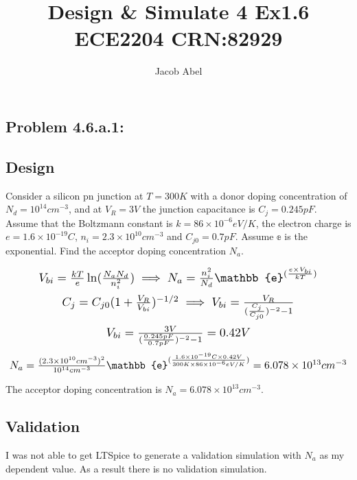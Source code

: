 \documentclass[12pt,letterpaper,titlepage]{article}
\author{Jacob Abel}
\title{	Design \& Simulate 4 Ex1.6
	\\\large ECE2204 CRN:82929
}
\begin{document}
\maketitle
\begin{raggedright}

\section{Problem 4.6.a.1: }
\subsection{Design}

Consider a silicon pn junction at $T = 300 K$ with a donor doping concentration of $N_d = 10^{14} cm^{-3}$, and at $V_R = 3V$ the junction capacitance is $C_j = 0.245 pF$. Assume that the Boltzmann constant is $k=86\times 10^{-6} eV/K$, the electron charge is $e = 1.6 \times 10^{-19} C$, $n_i = 2.3 \times 10^{10} cm^{-3}$ and $C_{j0} = 0.7 pF$. Assume $\mathbb{e}$ is the exponential. Find the acceptor doping concentration $N_a$.


\begin{equation}\scalebox{1.25}{
$
V_{bi} = \frac{kT}{e}\ln(\frac{N_aN_d}{n_i^2}) 
\implies N_a = \frac{n_i^2}{N_d}\mathbb{e}^{(\frac{e\times V_{bi}}{kT})}
$
}
\end{equation}
\begin{equation}\scalebox{1.25}{
$
C_j = C_{j0}(1 + \frac{V_R}{V_{bi}})^{-1/2} 
\implies V_{bi} = \frac{V_R}{(\frac{C_j}{C_{j0}})^{-2} - 1}
$
}
\end{equation}
\begin{equation}\scalebox{1.25}{
$
V_{bi} = \frac{3V}{(\frac{0.245pF}{0.7pF})^{-2} - 1} = 0.42V
$
}
\end{equation}
\begin{equation}\scalebox{1.25}{
$
N_a = \frac{(2.3 \times 10^{10} cm^{-3})^2}{10^{14} cm^{-3}}\mathbb{e}^{(\frac{1.6 \times 10^{-19} C\times0.42V}{300K \times 86\times 10^{-6} eV/K})} = 6.078\times 10^{13} cm^{-3}
$
}
\end{equation}

The acceptor doping concentration is $N_a = 6.078\times 10^{13} cm^{-3}$.
	
\subsection{Validation}

I was not able to get LTSpice to generate a validation simulation with $N_a$ as my dependent value. As a result there is no validation simulation. 


\end{raggedright}
\end{document}
